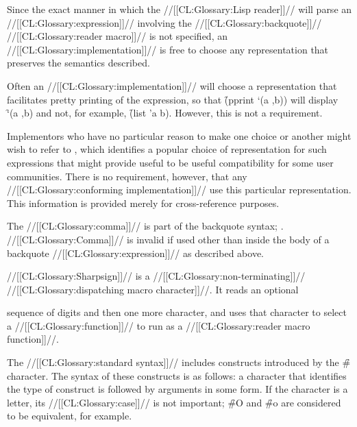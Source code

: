 Since the exact manner in which the //[[CL:Glossary:Lisp reader]]// will parse
an //[[CL:Glossary:expression]]// involving the //[[CL:Glossary:backquote]]// //[[CL:Glossary:reader macro]]// 
is not specified, an //[[CL:Glossary:implementation]]// is free to choose any
representation that preserves the semantics described.

Often an //[[CL:Glossary:implementation]]// will choose a representation that facilitates
pretty printing of the expression, so that \f{(pprint `(a ,b))} will display
\f{`(a ,b)} and not, for example, \f{(list 'a b)}.  However, this is not a
requirement.

Implementors who have no particular reason to make one choice or another
might wish to refer to {\IEEEScheme}, which identifies a popular choice of
representation for such expressions that might provide useful to be useful
compatibility for some user communities.  There is no requirement, however,
that any //[[CL:Glossary:conforming implementation]]// use this particular representation.
This information is provided merely for cross-reference purposes.

\endsubsubsection%

\endsubsection%

\idxcode{,}


           
The //[[CL:Glossary:comma]]// is part of the backquote syntax; \seesection\Backquote.
//[[CL:Glossary:Comma]]// is invalid if used other than inside the body of a 
backquote //[[CL:Glossary:expression]]// as described above.

\endsubsection%

\idxcode{\#}




//[[CL:Glossary:Sharpsign]]// is a //[[CL:Glossary:non-terminating]]// //[[CL:Glossary:dispatching macro character]]//.
It reads an optional 

sequence of digits and then one more character,
and uses that character to select a //[[CL:Glossary:function]]// to run as a
//[[CL:Glossary:reader macro function]]//.


The //[[CL:Glossary:standard syntax]]// includes constructs introduced by the \f{\#} character.
The syntax of these constructs is as follows:
a character that identifies the type of construct is 
followed by arguments in some form.
If the character is a letter, its //[[CL:Glossary:case]]// is not important;
\f{\#O} and \f{\#o} are considered to be equivalent, for example.


